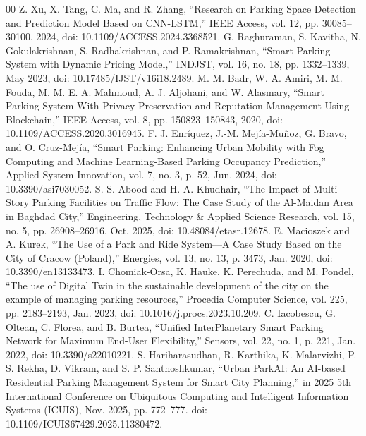 \documentclass[conference]{IEEEtran}
\begin{document}
\begin{thebibliography}{00}
 Z. Xu, X. Tang, C. Ma, and R. Zhang, “Research on Parking Space Detection and Prediction Model Based on CNN-LSTM,” IEEE Access, vol. 12, pp. 30085–30100, 2024, doi: 10.1109/ACCESS.2024.3368521.
 G. Raghuraman, S. Kavitha, N. Gokulakrishnan, S. Radhakrishnan, and P. Ramakrishnan, “Smart Parking System with Dynamic Pricing Model,” INDJST, vol. 16, no. 18, pp. 1332–1339, May 2023, doi: 10.17485/IJST/v16i18.2489.
 M. M. Badr, W. A. Amiri, M. M. Fouda, M. M. E. A. Mahmoud, A. J. Aljohani, and W. Alasmary, “Smart Parking System With Privacy Preservation and Reputation Management Using Blockchain,” IEEE Access, vol. 8, pp. 150823–150843, 2020, doi: 10.1109/ACCESS.2020.3016945.
 F. J. Enríquez, J.-M. Mejía-Muñoz, G. Bravo, and O. Cruz-Mejía, “Smart Parking: Enhancing Urban Mobility with Fog Computing and Machine Learning-Based Parking Occupancy Prediction,” Applied System Innovation, vol. 7, no. 3, p. 52, Jun. 2024, doi: 10.3390/asi7030052.
 S. S. Abood and H. A. Khudhair, “The Impact of Multi-Story Parking Facilities on Traffic Flow: The Case Study of the Al-Maidan Area in Baghdad City,” Engineering, Technology \& Applied Science Research, vol. 15, no. 5, pp. 26908–26916, Oct. 2025, doi: 10.48084/etasr.12678.
 E. Macioszek and A. Kurek, “The Use of a Park and Ride System—A Case Study Based on the City of Cracow (Poland),” Energies, vol. 13, no. 13, p. 3473, Jan. 2020, doi: 10.3390/en13133473.
 I. Chomiak-Orsa, K. Hauke, K. Perechuda, and M. Pondel, “The use of Digital Twin in the sustainable development of the city on the example of managing parking resources,” Procedia Computer Science, vol. 225, pp. 2183–2193, Jan. 2023, doi: 10.1016/j.procs.2023.10.209.
 C. Iacobescu, G. Oltean, C. Florea, and B. Burtea, “Unified InterPlanetary Smart Parking Network for Maximum End-User Flexibility,” Sensors, vol. 22, no. 1, p. 221, Jan. 2022, doi: 10.3390/s22010221.
 S. Hariharasudhan, R. Karthika, K. Malarvizhi, P. S. Rekha, D. Vikram, and S. P. Santhoshkumar, “Urban ParkAI: An AI-based Residential Parking Management System for Smart City Planning,” in 2025 5th International Conference on Ubiquitous Computing and Intelligent Information Systems (ICUIS), Nov. 2025, pp. 772–777. doi: 10.1109/ICUIS67429.2025.11380472.
\end{thebibliography}
\end{document}
